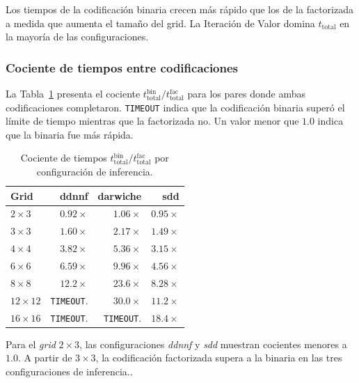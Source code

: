 Los tiempos de la codificación binaria crecen más rápido que los de la factorizada a medida que aumenta el tamaño del grid. La Iteración de Valor domina $t_{\text{total}}$ en la mayoría de las configuraciones. 

\clearpage

\subsubsection{Cociente de tiempos entre codificaciones}
\label{sec:exp-speedup}

La Tabla~\ref{tab:exp-speedup} presenta el cociente $t_{\text{total}}^{\text{bin}} / t_{\text{total}}^{\text{fac}}$ para los pares donde ambas codificaciones completaron. \texttt{TIMEOUT} indica que la codificación binaria superó el límite de tiempo mientras que la factorizada no. Un valor menor que $1.0$ indica que la binaria fue más rápida.

\begin{table}[htbp]
    \centering
    \caption{Cociente de tiempos $t_{\text{total}}^{\text{bin}} / t_{\text{total}}^{\text{fac}}$ por configuración de inferencia.}
    \label{tab:exp-speedup}
    \small
    \begin{tabular}{l r r r}
        \toprule
        \textbf{Grid} & \textbf{ddnnf} & \textbf{darwiche} & \textbf{sdd} \\
        \midrule
        $2 \times 3$   & $0.92\times$ & $1.06\times$ & $0.95\times$ \\
        $3 \times 3$   & $1.60\times$ & $2.17\times$ & $1.49\times$ \\
        $4 \times 4$   & $3.82\times$ & $5.36\times$ & $3.15\times$ \\
        $6 \times 6$   & $6.59\times$ & $9.96\times$ & $4.56\times$ \\
        $8 \times 8$   & $12.2\times$ & $23.6\times$ & $8.28\times$ \\
        $12 \times 12$ & \texttt{TIMEOUT}.   & $30.0\times$ & $11.2\times$ \\
        $16 \times 16$ & \texttt{TIMEOUT}.   & \texttt{TIMEOUT}.   & $18.4\times$ \\
        \bottomrule
    \end{tabular}
\end{table}

Para el \textit{grid} $2\times3$, las configuraciones \textit{ddnnf} y \textit{sdd} muestran cocientes menores a $1.0$. A partir de $3\times3$, la codificación factorizada supera a la binaria en las tres configuraciones de inferencia..

